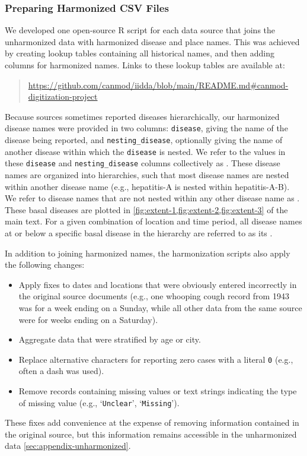 \documentclass[12pt]{article}
\begin{document}
\subsubsection{Preparing Harmonized CSV Files}\label{sec:appendix-harmonized}

We developed one open-source R script for each data source that joins the unharmonized data with harmonized disease and place names. This was achieved by creating lookup tables containing all historical names, and then adding columns for harmonized names. Links to these lookup tables are available at:
\begin{quote}
\url{https://github.com/canmod/iidda/blob/main/README.md#canmod-digitization-project}
\end{quote}

Because sources sometimes reported diseases hierarchically, our harmonized disease names were provided in two columns: \texttt{disease}, giving the name of the disease being reported, and \texttt{nesting\_disease}, optionally giving the name of another disease within which the \texttt{disease} is nested. We refer to the values in these \texttt{disease} and \texttt{nesting\_disease} columns collectively as . These disease names are organized into hierarchies, such that most disease names are nested within another disease name (e.g., hepatitis-A is nested within hepatitis-A-B). We refer to disease names that are not nested within any other disease name as . These basal diseases are plotted in \cref{fig:extent-1,fig:extent-2,fig:extent-3} of the main text. For a given combination of location and time period, all disease names at or below a specific basal disease in the hierarchy are referred to as its .

In addition to joining harmonized names, the harmonization scripts also apply the following changes:
\begin{itemize}
\item Apply fixes to dates and locations that were obviously entered incorrectly in the original source documents (e.g., one whooping cough record from 1943 was for a week ending on a Sunday, while all other data from the same source were for weeks ending on a Saturday).
\item Aggregate data that were stratified by age or city.
\item Replace alternative characters for reporting zero cases with a literal \texttt{0} (e.g., often a dash was used).
\item Remove records containing missing values or text strings indicating the type of missing value (e.g., `\texttt{Unclear}', `\texttt{Missing}').
\end{itemize}
These fixes add convenience at the expense of removing information contained in the original source, but this information remains accessible in the unharmonized data \cref{sec:appendix-unharmonized}.
\end{document}
